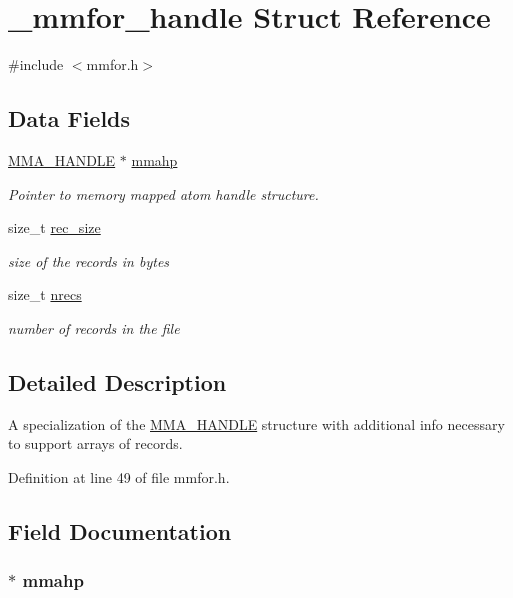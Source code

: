 \hypertarget{struct__mmfor__handle}{\section{\-\_\-mmfor\-\_\-handle Struct Reference}
\label{struct__mmfor__handle}
}


{\ttfamily \#include $<$mmfor.\-h$>$}

\subsection*{Data Fields}
\begin{DoxyCompactItemize}
\item 
\hyperlink{struct_m_m_a___h_a_n_d_l_e}{M\-M\-A\-\_\-\-H\-A\-N\-D\-L\-E} $\ast$ \hyperlink{struct__mmfor__handle_aa0a4574bd17938fbecf228583f6a70e4}{mmahp}
\begin{DoxyCompactList}\small\item\em Pointer to memory mapped atom handle structure. \end{DoxyCompactList}\item 
size\-\_\-t \hyperlink{struct__mmfor__handle_a6af15626e40c23bd7d5b67f5a54c8344}{rec\-\_\-size}
\begin{DoxyCompactList}\small\item\em size of the records in bytes \end{DoxyCompactList}\item 
size\-\_\-t \hyperlink{struct__mmfor__handle_a218d36060722882d76c8d10b73edb6a6}{nrecs}
\begin{DoxyCompactList}\small\item\em number of records in the file \end{DoxyCompactList}\end{DoxyCompactItemize}


\subsection{Detailed Description}
A specialization of the \hyperlink{struct_m_m_a___h_a_n_d_l_e}{M\-M\-A\-\_\-\-H\-A\-N\-D\-L\-E} structure with additional info necessary to support arrays of records. 

Definition at line 49 of file mmfor.\-h.



\subsection{Field Documentation}
\hypertarget{struct__mmfor__handle_aa0a4574bd17938fbecf228583f6a70e4}{
\subsubsection[{mmahp}]{$\ast$ mmahp}}\label{struct__mmfor__handle_aa0a4574bd17938fbecf228583f6a70e4}


